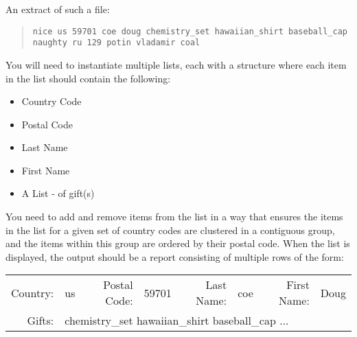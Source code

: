 \documentclass[10pt,letterpaper]{article}
\newcounter{x}\setcounter{x}{1}
\begin{document}
An extract of such a file:
\begin{quote}
	\verb|nice us 59701 coe doug chemistry_set hawaiian_shirt baseball_cap|\\
	\verb|naughty ru 129 potin vladamir coal|
\end{quote}

You will need to instantiate multiple lists, each with a structure where each item in the list should contain the following: 
\begin{itemize}
	\item Country Code
	\item Postal Code
	\item Last Name
	\item First Name
	\item A List - of gift(s)
\end{itemize}

You need to add and remove items from the list in a way that ensures the items in the list for a given set of country codes are clustered in a contiguous group, and the items within this group are ordered by their postal code. When the list is displayed, the output should be a report consisting of multiple rows of the form: \\

\begin{tabular}{rl rl rl rl}
	\hline
	Country: & us & Postal Code: & 59701 & Last Name: & coe & First Name: & Doug \\
	Gifts: & \multicolumn{7}{l}{chemistry\_set hawaiian\_shirt baseball\_cap ...} \\
	\hline
\end{tabular}\\
\end{document}
